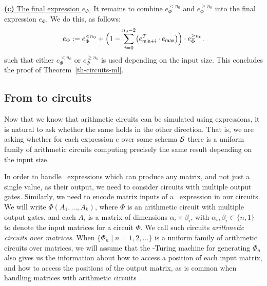 \medskip
\noindent
\underline{\textbf{(c)} The final expression $e_\Phi$.}
It remains to combine $e_\Phi^{< n_0}$ and $e_{\Phi}^{\geq n_0}$ into the final expression
$e_\Phi$. We do this, as follows:
$$
e_\Phi:=e_\Phi^{< n_0} + \Bigl(1 - \sum_{i=0}^{n_0-2} \bigl(e_{\mathsf{min}+\mathsf{i}}^T\cdot e_{\mathsf{max}}\bigr)\Bigr)\cdot e_{\Phi}^{\geq n_0}.
$$
such that either $e_{\Phi}^{<n_0}$ or $e_{\Phi}^{\geq n_0}$ is used depending on the input size.
This concludes the proof of Theorem~\ref{th-circuits-ml}.



\subsection{From \langfor to circuits}\label{subsec:formatlangtoac}

Now that we know that arithmetic circuits can be simulated using \langfor expressions, it is natural to ask whether the same holds in the other direction. That is, we are asking whether for each \langfor expression $e$ over some schema $\mathcal{S}$ there is a uniform family of arithmetic circuits computing precisely the same result depending on the input size. 

In order to handle  \langfor\ expressions which can produce any matrix, and not just a single value, as their output, we need to consider circuits with multiple output gates. Similarly, we need to encode matrix inputs of a \langfor\ expression in our circuits. We will write $\Phi(A_1,\ldots ,A_k)$, where $\Phi$ is an arithmetic circuit with multiple output gates, and each $A_i$ is a matrix of dimensions $\alpha_i\times \beta_i$, with $\alpha_i,\beta_i \in \{n,1\}$ to denote the input matrices for a circuit $\Phi$. 
We call such circuits \textit{arithmetic circuits over matrices}. When $\{\Phi_n\mid n=1,2,\ldots\}$ is a uniform family of arithmetic circuits over matrices, we will assume that the \logspace-Turing machine for generating $\Phi_n$ also gives us the information about how to access a position of each input matrix, and how to access the positions of the output matrix, as is common when handling matrices with arithmetic circuits \cite{Raz02}. 


